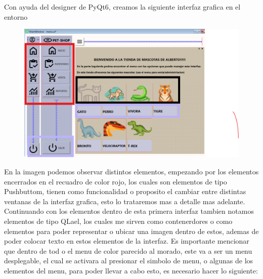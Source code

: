 \documentclass[11pt]{article}
\begin{document}
Con ayuda del designer de PyQt6, creamos la siguiente interfaz grafica en el entorno
\begin{figure}[H]
		\begin{center}
 			\includegraphics[width = .8\textwidth]{01.png}
 			
		\end{center} 
\end{figure}
En la imagen podemos observar distintos elementos, empezando por los elementos encerrados en el recuadro de color rojo, los cuales son elementos de tipo Pushbuttom, tienen como funcionalidad o proposito el cambiar entre distintas ventanas de la interfaz grafica, esto lo trataremos mas a detalle mas adelante. Continuando con los elementos dentro de esta primera interfaz tambien notamos elementos de tipo QLael, los cuales me sirven como contenerdores o como elementos para poder representar o ubicar una imagen dentro de estos, ademas de poder colocar texto en estos elementos de la interfaz.
Es importante mencionar que dentro  de tod o el menu de color parecido al morado, este va a ser un menu desplegable, el cual se activara al presionar el simbolo de menu, o algunas de los elementos del menu, para poder llevar a cabo esto, es necesario hacer lo siguiente: 
\end{document}
